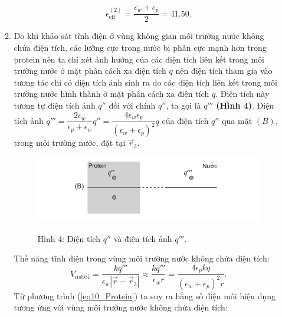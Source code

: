 \begin{enumerate}
\begin{enumerate}[label=\textbf{\alph*,}]
\begin{equation} \label{eq9_Protein}
    \epsilon_{\text{eff}}^{(2)}=\dfrac{\epsilon_w+\epsilon_p}{2}=41.50.
\end{equation}
          \item Do khi khảo sát tĩnh điện ở vùng không gian môi trường nước không chứa điện tích, các lưỡng cực trong nước bị phân cực mạnh hơn trong protein nên ta chỉ xét ảnh hưởng của các điện tích liên kết trong môi trường nước ở mặt phân cách xa điện tích $q$ nên điện tích tham gia vào tương tác chỉ có điện tích ảnh sinh ra do các điện tích liên kết trong môi trường nước hình thành ở mặt phân cách xa điện tích $q$. Điện tích này tương tự điện tích ảnh $q''$ đối với chính $q''$, ta gọi là $q'''$ \textbf{(Hình 4)}. Điện tích ảnh $q'''=\dfrac{2\epsilon_w}{\epsilon_p+\epsilon_w}q''=\dfrac{4\epsilon_w\epsilon_p}{(\epsilon_w+\epsilon_p)^2}q$ của điện tích $q''$ qua mặt $(B)$, trong môi trường nước, đặt tại $\Vec{r}_3$.\\
\begin{center}
    \begin{figure}[htp]
    \begin{center}
        \includegraphics[scale=.27
        ]{Problem_13/image/4.png}
    \end{center}
    \begin{center}
    Hình 4: Điện tích $q''$ và điện tích ảnh $q'''$.
    \end{center}
    \end{figure}
\end{center}
          Thế năng tĩnh điện trong vùng môi trường nước không chứa điện tích:
          \begin{equation} \label{eq10_Protein}
              V_{\text{nước}\downarrow}=\dfrac{kq'''}{\epsilon_w \left|\Vec{r}-\Vec{r}_3\right|} \approx \dfrac{kq'''}{\epsilon_w r}=\dfrac{4\epsilon_p kq}{(\epsilon_w+\epsilon_p)^2 r}.
          \end{equation}
          Từ phương trình (\ref{eq10_Protein}) ta suy ra hằng số điện môi hiệu dụng tương ứng với vùng môi trường nước không chứa điện tích:
          \begin{equation} \label{eq11_Protein}

\end{equation}
\end{enumerate}
\end{enumerate}
